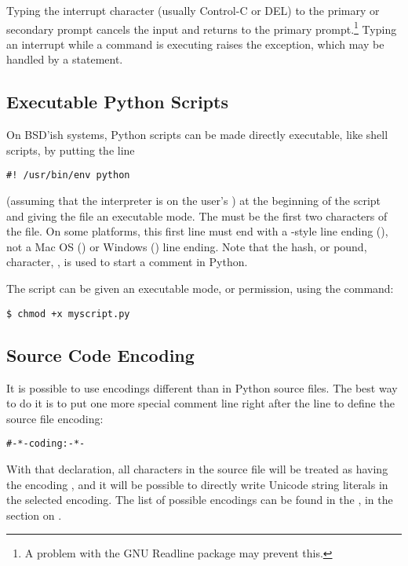 \documentclass{manual}
\begin{document}
Typing the interrupt character (usually Control-C or DEL) to the
primary or secondary prompt cancels the input and returns to the
primary prompt.\footnote{
        A problem with the GNU Readline package may prevent this.
}
Typing an interrupt while a command is executing raises the
 exception, which may be handled by a
 statement.

\subsection{Executable Python Scripts \label{scripts}}

On BSD'ish \UNIX{} systems, Python scripts can be made directly
executable, like shell scripts, by putting the line

\begin{verbatim}
#! /usr/bin/env python
\end{verbatim}

(assuming that the interpreter is on the user's ) at the
beginning of the script and giving the file an executable mode.  The
\samp{\#!} must be the first two characters of the file.  On some
platforms, this first line must end with a \UNIX-style line ending
(), not a Mac OS () or Windows
() line ending.  Note that
the hash, or pound, character, \character{\#}, is used to start a
comment in Python.

The script can be given an executable mode, or permission, using the
 command:

\begin{verbatim}
$ chmod +x myscript.py
\end{verbatim} %


\subsection{Source Code Encoding}

It is possible to use encodings different than \ASCII{} in Python source
files. The best way to do it is to put one more special comment line
right after the \code{\#!} line to define the source file encoding:

\begin{alltt}
# -*- coding:  -*- 
\end{alltt}

With that declaration, all characters in the source file will be treated as
having the encoding , and it will be
possible to directly write Unicode string literals in the selected
encoding.  The list of possible encodings can be found in the
, in the section
on .
\end{document}
